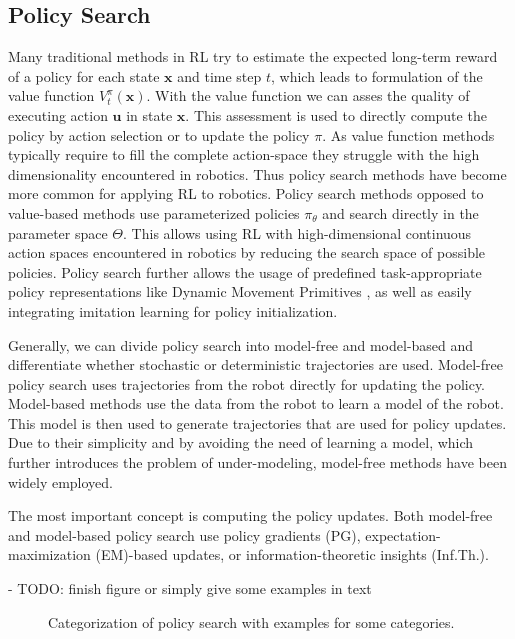 \subsection{Policy Search}
Many traditional methods in RL try to estimate the
expected long-term reward of a policy for each state $\mathbf{x}$
and time step $t$, which leads to formulation of the value function $V^{\pi}_t(\mathbf{x})$.
With the value function we can asses the quality of executing action
$\mathbf{u}$ in state $\mathbf{x}$. This assessment is used
to directly compute the policy by action selection or to update
the policy $\pi$. As value function methods typically require
to fill the complete action-space they struggle with
the high dimensionality encountered in robotics.
Thus policy search methods have become more common
for applying RL to robotics.
Policy search methods opposed to value-based methods
use parameterized policies $\pi_{\theta}$ and search
directly in the parameter space $\Theta$. This allows using RL with
high-dimensional continuous action spaces encountered
in robotics by reducing the search space of possible policies.
Policy search further allows the usage of predefined
task-appropriate policy representations like Dynamic
Movement Primitives \citep{schaal2005learning}, as well
as easily integrating imitation learning
for policy initialization.

Generally, we can divide policy search into model-free and model-based and
differentiate whether stochastic or deterministic trajectories are used.
Model-free policy search uses trajectories from the robot directly
for updating the policy. Model-based methods use the data
from the robot to learn a model of the robot. This model is then used
to generate trajectories that are used for policy updates.
Due to their simplicity and by avoiding the need of learning a model,
which further introduces the problem of under-modeling,
model-free methods have been widely employed.

The most important concept is computing the policy updates.
Both model-free and model-based policy search use policy gradients (PG),
expectation-maximization (EM)-based updates, or
information-theoretic insights (Inf.Th.).

- TODO: finish figure or simply give some examples in text

\begin{figure}[ht!]
    \centering
    \caption{Categorization of policy search with examples for
      some categories.}
    \label{fig:inversion}
\end{figure}

